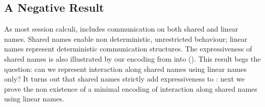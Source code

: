 \documentclass[preprint,11pt]{elsarticle}
\begin{document}
{%
%
%



\subsection{A Negative Result}
\label{ss:negative}
%

As most session calculi, 
\HOp includes communication on both shared and linear names.
Shared names enable non deterministic, unrestricted behaviour; 
linear names represent deterministic communication structures.
The expressiveness of shared names is also illustrated by our 
encoding from \HOp into \sessp ().
This result begs the question: 
can we represent  interaction along shared names using linear names only?
It turns out that shared names strictly add expressiveness to \HOp:
next we prove
the non existence of a minimal encoding 
of interaction along shared names 
using linear names. %

}
\end{document}
